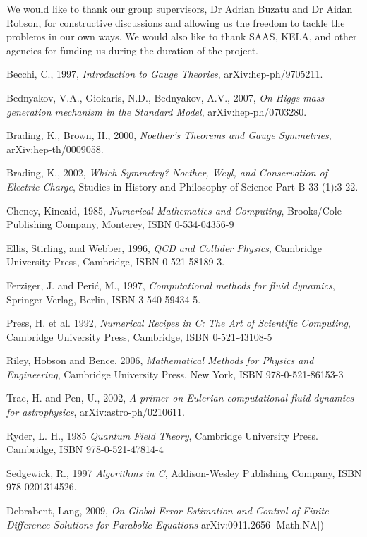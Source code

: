 \documentclass[aps,twocolumn,pre,nofootinbib,10pt]{revtex4-1}
\begin{document}
\begin{acknowledgments}
We would like to thank our group supervisors, Dr Adrian Buzatu and Dr Aidan Robson, for constructive discussions and allowing us the freedom to tackle the problems in our own ways. We would also like to thank SAAS, KELA, and other agencies for funding us during the duration of the project.
\end{acknowledgments}

\begin{thebibliography}{5}

 Becchi, C., 1997, \emph{Introduction to Gauge Theories}, arXiv:hep-ph/9705211.

 Bednyakov, V.A., Giokaris, N.D., Bednyakov, A.V., 2007, \emph{On Higgs mass generation mechanism in the Standard Model}, 	arXiv:hep-ph/0703280.

 Brading, K., Brown, H., 2000, \emph{Noether's Theorems and Gauge Symmetries}, arXiv:hep-th/0009058.

 Brading, K., 2002, \emph{Which Symmetry? Noether, Weyl, and Conservation of Electric Charge}, Studies in History and Philosophy of Science Part B 33 (1):3-22.

 Cheney, Kincaid, 1985, \emph{Numerical Mathematics and Computing}, Brooks/Cole Publishing Company, Monterey, ISBN 0-534-04356-9

 Ellis, Stirling, and Webber, 1996, \emph{QCD and Collider Physics}, Cambridge University Press, Cambridge, ISBN 0-521-58189-3.

 Ferziger, J. and Peri\'c, M., 1997, \emph{Computational methods for fluid dynamics}, Springer-Verlag, Berlin, ISBN 3-540-59434-5.


 Press, H. et al. 1992, \emph{Numerical Recipes in C: The Art of Scientific Computing}, Cambridge University Press, Cambridge, ISBN 0-521-43108-5

 Riley, Hobson and Bence, 2006, \emph{Mathematical Methods for Physics and Engineering}, Cambridge University Press, New York, ISBN 978-0-521-86153-3

 Trac, H. and Pen, U., 2002, \emph{A primer on Eulerian computational fluid dynamics for astrophysics}, arXiv:astro-ph/0210611.

 Ryder, L. H., 1985 \emph{Quantum Field Theory}, Cambridge University Press. Cambridge, ISBN 978-0-521-47814-4

 Sedgewick, R., 1997 \emph{Algorithms in C}, Addison-Wesley Publishing Company, ISBN 978-0201314526.

 Debrabent, Lang, 2009, \emph{On Global Error Estimation and Control of Finite Difference Solutions for Parabolic Equations} arXiv:0911.2656 [Math.NA])

\end{thebibliography}
\end{document}
